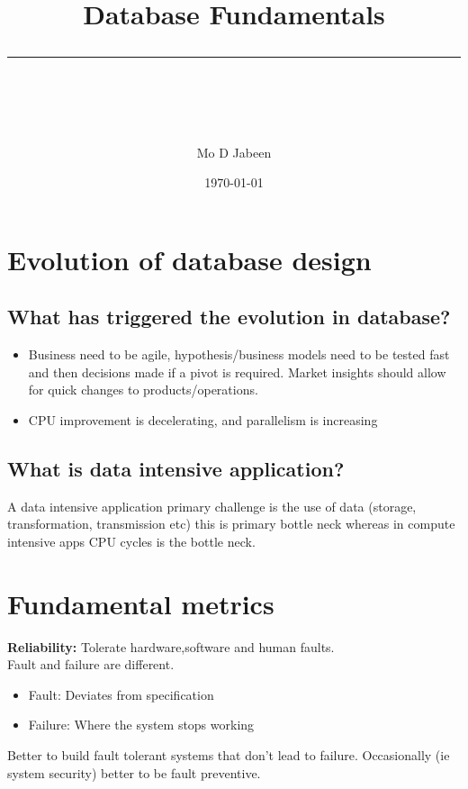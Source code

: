 \documentclass[11pt]{scrartcl} %
\title{	
	\normalfont\normalsize
	\vspace{20pt} %
	{\huge Database Fundamentals}\\ %
	\vspace{12pt} %
	\rule{\linewidth}{2pt}\\ %
}
\author{\small Mo D Jabeen} %
\date{\normalsize\today} %
\begin{document}
\maketitle %

\section{Evolution of database design}

\subsection{What has triggered the evolution in database?}

\begin{itemize}
	\item Business need to be agile, hypothesis/business models need to be tested fast and then
	decisions made if a pivot is required. Market insights should allow for quick changes to products/operations.
	\item CPU improvement is decelerating, and parallelism is increasing
\end{itemize}

\subsection{What is data intensive application?}

A data intensive application primary challenge is the use of data (storage, transformation, transmission etc)
this is primary bottle neck whereas in compute intensive apps CPU cycles is the bottle neck.

\section{Fundamental metrics}

\textbf{Reliability:} Tolerate hardware,software and human faults.\\

Fault and failure are different.

\begin{itemize}
	\item Fault: Deviates from specification
	\item Failure: Where the system stops working
\end{itemize}

Better to build fault tolerant systems that don't lead to failure. Occasionally (ie system security)
better to be fault preventive.
\end{document}
